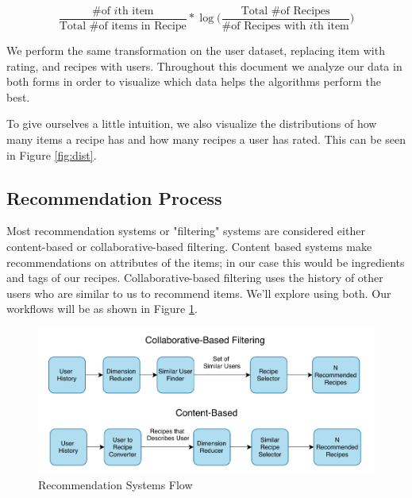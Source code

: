 \documentclass[11pt]{article}
\newcommand*\textfrac[2]{
  \frac{\text{#1}}{\text{#2}}
}
\begin{document}
$$\textfrac{\# of $i$th item}{Total \# of items in Recipe} * \log \Big( \textfrac{Total \# of Recipes}{\# of Recipes with $i$th item} \Big)$$

We perform the same transformation on the user dataset, replacing item with rating, and recipes with users. Throughout this document we analyze our data in both forms in order to visualize which data helps the algorithms perform the best.

To give ourselves a little intuition, we also visualize the distributions of how many items a recipe has and how many recipes a user has rated. This can be seen in Figure \ref{fig:dist}.


\subsection{Recommendation Process}
Most recommendation systems or "filtering" systems are considered either content-based or collaborative-based filtering. Content based systems make recommendations on attributes of the items; in our case this would be ingredients and tags of our recipes. Collaborative-based filtering uses the history of other users who are similar to us to recommend items. We'll explore using both. Our workflows will be as shown in Figure \ref{fig:flow}.

\begin{figure}[t]
\centering
\includegraphics[width=1\textwidth]{figs/flow.pdf}
\caption{Recommendation Systems Flow}
\label{fig:flow}
\end{figure}
\end{document}
